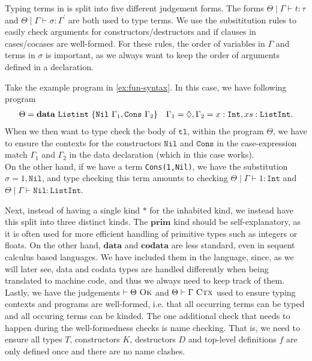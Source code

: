 Typing terms in \surfacelang{} is split into five different judgement forms.
The forms $\Theta\mid\Gamma\vdash t:\tau$ and $\Theta\mid\Gamma\vdash\sigma:\Gamma^{\prime}$ are both used to type terms.
We use the subsititution rules to easily check arguments for constructors/destructors and if clauses in cases/cocases are well-formed.
For these rules, the order of variables in $\Gamma$ and terms in $\sigma$ is important, as we always want to keep the order of arguments defined in a declaration.
\begin{example}
  Take the example program in \cref{ex:fun-syntax}.
  In this case, we have following program
  \begin{align*}
    \Theta= \mathbf{data}\ \mathtt{Listint}\ \{\mathtt{Nil}\ \Gamma_1, \mathtt{Cons}\ \Gamma_2\} \quad
    \Gamma_1=\Diamond, \Gamma_2 = x:\mathtt{Int}, xs:\mathtt{ListInt}.
  \end{align*}
  When we then want to type check the body of $\mathtt{tl}$, within the program $\Theta$,
  we have to ensure the contexts for the constructors $\mathtt{Nil}$ and $\mathtt{Cons}$ in the case-expression match $\Gamma_1$ and $\Gamma_2$ in the data declaration (which in this case works).\\
  On the other hand, if we have a term \lstinline{Cons(1,Nil)}, we have the substitution $\sigma = 1,\mathtt{Nil}$, and type checking this term amounts to checking
  $\Theta\mid\Gamma \vdash 1:\mathtt{Int}$ and $\Theta\mid\Gamma\vdash \mathtt{Nil}:\mathtt{ListInt}$.
\end{example}
Next, instead of having a single kind $*$ for the inhabited kind, we instead have this split into three distinct kinds.
The $\mathbf{prim}$ kind should be self-explanatory, as it is often used for more efficient handling of primitive types such as integers or floats.
On the other hand, $\mathbf{data}$ and $\mathbf{codata}$ are less standard, even in sequent calculus based languages.
We have included them in the language, since, as we will later see, data and codata types are handled differently when being translated to machine code, and thus we always need to keep track of them.\\
Lastly, we have the judgements $\vdash \Theta\ \textsc{Ok}$ and $\Theta\vdash\Gamma\ \textsc{Ctx}$ used to ensure typing contexts and programs are well-formed,
i.e. that all occurring terms can be typed and all occuring terms can be kinded.
The one additional check that needs to happen during the well-formedness checks is name checking.
That is, we need to ensure all types $T$, constructors $K$, destructors $D$ and top-level definitions $f$ are only defined once and there are no name clashes.
